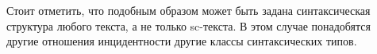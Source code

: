 \begin{SCn}
{Стоит отметить, что подобным образом может быть задана синтаксическая структура любого текста, а не только sc-текста. В этом случае понадобятся другие отношения инцидентности другие классы синтаксических типов.}

\bigskip
\scnendstruct \scnendcurrentsectioncomment

\end{SCn}